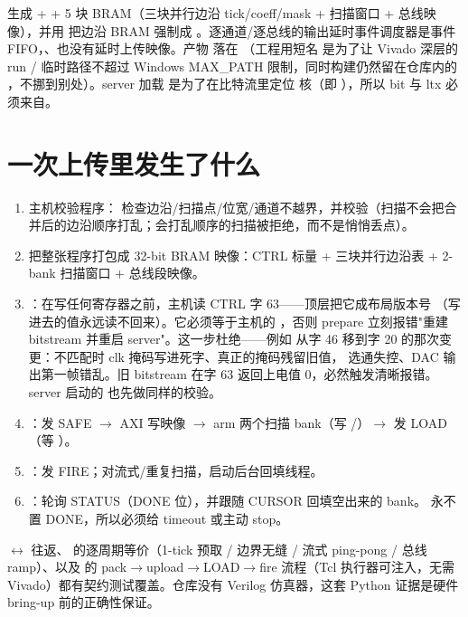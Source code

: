 \documentclass[11pt,oneside,openany]{book}
\begin{document}
 生成  +  + 5 块 BRAM（三块并行边沿 tick/coeff/mask + 扫描窗口 + 总线映像），并用  把边沿 BRAM 强制成 。逐通道/逐总线的输出延时事件调度器是事件 FIFO，、也没有延时上传映像。产物  落在 （工程用短名  是为了让 Vivado 深层的 run /  临时路径不超过 Windows MAX\_PATH 限制，同时构建仍然留在仓库内的 ，不挪到别处）。server 加载  是为了在比特流里定位  核（即 ），所以 bit 与 ltx 必须来自。

\section{一次上传里发生了什么}
\begin{enumerate}
  \item 主机校验程序： 检查边沿/扫描点/位宽/通道不越界，并校验（扫描不会把合并后的边沿顺序打乱；会打乱顺序的扫描被拒绝，而不是悄悄丢点）。
  \item {} 把整张程序打包成 32-bit BRAM 映像：CTRL 标量 + 三块并行边沿表 + 2-bank 扫描窗口 + 总线段映像。
  \item {}：在写任何寄存器之前，主机读 CTRL 字 63——顶层把它成布局版本号 （写进去的值永远读不回来）。它必须等于主机的 ，否则 prepare 立刻报错"重建 bitstream 并重启 server"。这一步杜绝——例如  从字 46 移到字 20 的那次变更：不匹配时 clk 掩码写进死字、真正的掩码残留旧值， 选通失控、DAC 输出第一帧错乱。旧 bitstream 在字 63 返回上电值 0，必然触发清晰报错。server 启动的  也先做同样的校验。
  \item {}：发 SAFE $\rightarrow$ AXI 写映像 $\rightarrow$ arm 两个扫描 bank（写 /）$\rightarrow$ 发 LOAD（等 ）。
  \item {}：发 FIRE；对流式/重复扫描，启动后台回填线程。
  \item {}：轮询 STATUS（DONE 位），并跟随 CURSOR 回填空出来的 bank。 永不置 DONE，所以必须给 timeout 或主动 stop。
\end{enumerate}

\begin{notebox}
$\leftrightarrow$ 往返、 的逐周期等价（1-tick 预取 / 边界无缝 / 流式 ping-pong / 总线 ramp）、以及  的 pack$\rightarrow$upload$\rightarrow$LOAD$\rightarrow$fire 流程（Tcl 执行器可注入，无需 Vivado）都有契约测试覆盖。仓库没有 Verilog 仿真器，这套 Python 证据是硬件 bring-up 前的正确性保证。
\end{notebox}
\end{document}
